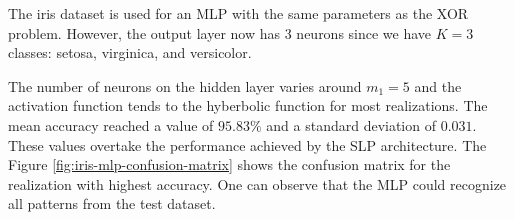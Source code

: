 \documentclass[12pt,a4paper]{article}
\begin{document}
The iris dataset is used for an MLP with the same parameters as the XOR problem. However, the output layer now has 3 neurons since we have \(K=3\) classes: setosa, virginica, and versicolor.

The number of neurons on the hidden layer varies around \(m_1=5\) and the activation function tends to the hyberbolic function for most realizations. The mean accuracy reached a value of \(95.83\%\) and a standard deviation of \(0.031\). These values overtake the performance achieved by the SLP architecture. The Figure \ref{fig:iris-mlp-confusion-matrix} shows the confusion matrix for the realization with highest accuracy. One can observe that the MLP could recognize all patterns from the test dataset.

\begin{figure}[H]
    \centering




\end{figure}
\end{document}
